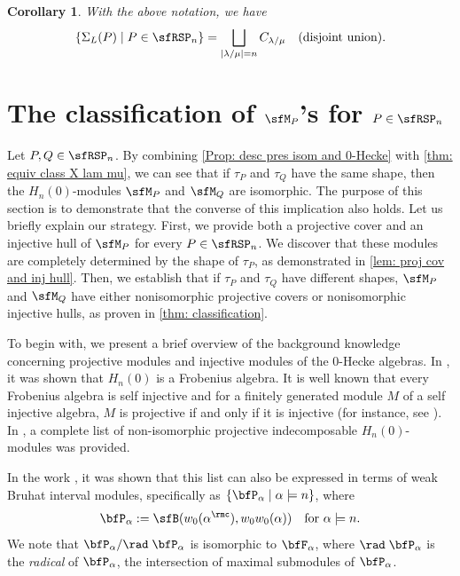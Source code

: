 \documentclass[12pt, reqno]{amsart}
\newtheorem{corollary}[theorem]{Corollary}
\theoremstyle{definition}
\numberwithin{equation}{section} \numberwithin{figure}{section}
\numberwithin{table}{section}
\begin{document}
\begin{corollary}\label{cor: equiv class closedness}
With the above notation,
we have
\[
\{\Sigma_L(P) \mid P \in \sfRSP_n \} = \bigsqcup_{|\lambda/\mu| = n} C_{\lambda / \mu} \quad \text{$($disjoint union$)$}.
\]
\end{corollary}




\section{The classification of $\sfM_P$'s  for $P \in \sfRSP_n$}
\label{sec: classification of X}

Let $P, Q \in \sfRSP_n$. By combining \cref{Prop: desc pres isom and 0-Hecke} with \cref{thm: equiv class X lam mu}, we can see that if $\tau_P$ and $\tau_Q$ have the same shape, then the $H_n(0)$-modules $\sfM_P$ and $\sfM_Q$ are isomorphic.
The purpose of this section is to demonstrate that the converse of this implication also holds. 
Let us briefly explain our strategy. First, we provide both a projective cover and an injective hull of $\sfM_P$ for every $P \in \sfRSP_n$. We discover that these modules are completely determined by the shape of $\tau_P$, as demonstrated in \cref{lem: proj cov and inj hull}. Then, we establish that if $\tau_P$ and $\tau_Q$ have different shapes, $\sfM_P$ and $\sfM_Q$ have either nonisomorphic projective covers or nonisomorphic injective hulls, as proven in \cref{thm: classification}.



To begin with, we present a brief overview of the background knowledge concerning projective modules and injective modules of the $0$-Hecke algebras.
In \cite[Proposition 4.1]{02DHT}, it was shown that $H_n(0)$ is a Frobenius algebra.
It is well known that every Frobenius algebra is self injective and for a finitely generated module $M$ of a self injective algebra, $M$ is projective if and only if it is injective (for instance, see \cite[Proposition 1.6.2]{91Benson}).
In \cite{79Norton}, a complete list of non-isomorphic projective indecomposable $H_n(0)$-modules was provided.


In the work \cite{22JKLO}, it was shown that this list can also be expressed in terms of weak Bruhat interval modules, specifically as $\{\bfP_\alpha \mid \alpha \models n\}$, where
\[
\bfP_\alpha := \sfB(w_0(\alpha^\rmc), w_0 w_0(\alpha)) \quad \text{for $\alpha \models n$.}
\]
We note that $\bfP_\alpha / \rad \; \bfP_\alpha$ is isomorphic to $\bfF_\alpha$, where $\rad \; \bfP_\alpha$ is the \emph{radical} of $\bfP_\alpha$, the intersection of maximal submodules of $\bfP_\alpha$.
\end{document}
